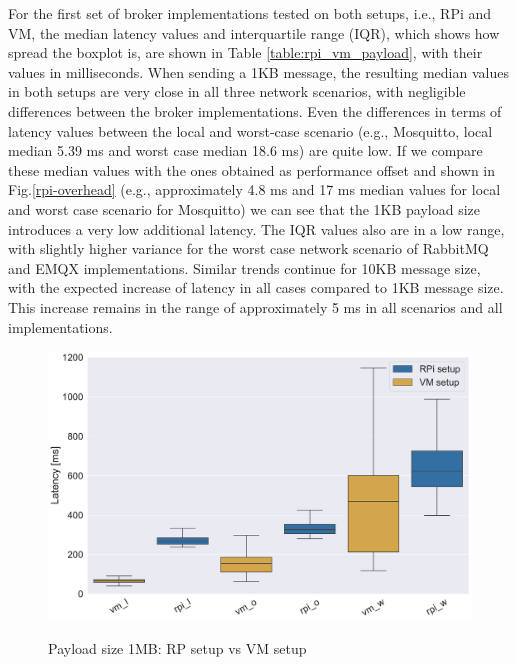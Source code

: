 \documentclass[conference]{IEEEtran}
\begin{document}
    For the first set of broker implementations tested on both setups, i.e., RPi and VM, the median latency
    values and interquartile range (IQR), which shows how spread the boxplot is, are shown in Table
    \ref{table:rpi_vm_payload}, with their values in milliseconds. When sending a 1KB message, the
    resulting median values in both setups are very close in all three network scenarios, with
    negligible differences between the broker implementations. Even the differences in terms of latency
    values between the local and worst-case scenario (e.g., Mosquitto, local median 5.39 ms and worst
    case median 18.6 ms) are quite low. If we compare these median values with the ones obtained as
    performance offset and shown in Fig.\ref{rpi-overhead} (e.g., approximately 4.8 ms and 17 ms median
    values for local and worst case scenario for Mosquitto) we can see that the 1KB payload size
    introduces a very low additional latency. The IQR values also are in a low range, with slightly
    higher variance for the worst case network scenario of RabbitMQ and EMQX
    implementations. Similar trends continue for 10KB message size, with the expected increase of
    latency in all cases compared to 1KB message size. This increase remains in the range of
    approximately 5 ms in all scenarios and all implementations.

\begin{figure}[!t] \label{vmrp}
    \centering
 {\includegraphics[width=1.0\columnwidth]{boxplot_all_mosquitto.pdf}} 
\caption{Payload size 1MB: RP setup vs VM setup}
\end{figure}
\end{document}
